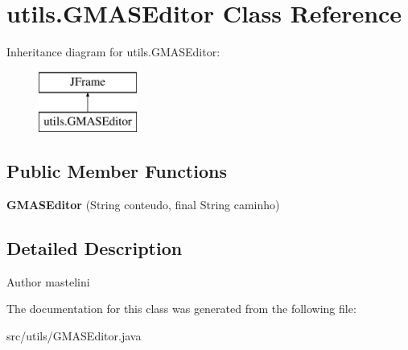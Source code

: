 \hypertarget{classutils_1_1_g_m_a_s_editor}{\section{utils.\+G\+M\+A\+S\+Editor Class Reference}
\label{classutils_1_1_g_m_a_s_editor}
}
Inheritance diagram for utils.\+G\+M\+A\+S\+Editor\+:\begin{figure}[H]
\begin{center}
\leavevmode
\includegraphics[height=2.000000cm]{classutils_1_1_g_m_a_s_editor}
\end{center}
\end{figure}
\subsection*{Public Member Functions}
\begin{DoxyCompactItemize}
\item 
\hypertarget{classutils_1_1_g_m_a_s_editor_a53dc984b80cc5707ae25170a7c52ed76}{{\bfseries G\+M\+A\+S\+Editor} (String conteudo, final String caminho)}\label{classutils_1_1_g_m_a_s_editor_a53dc984b80cc5707ae25170a7c52ed76}

\end{DoxyCompactItemize}


\subsection{Detailed Description}
\begin{DoxyAuthor}{Author}
mastelini 
\end{DoxyAuthor}


The documentation for this class was generated from the following file\+:\begin{DoxyCompactItemize}
\item 
src/utils/G\+M\+A\+S\+Editor.\+java\end{DoxyCompactItemize}
